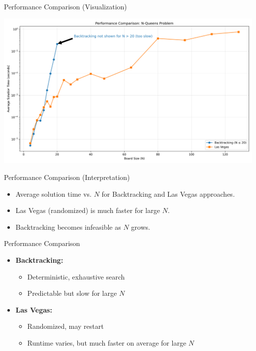 \begin{frame}{Performance Comparison (Visualization)}
  \vfill
  \begin{center}
    \includegraphics[height=0.95\textheight]{./programs/nqueens-lv/images/performance-comparison.png}
  \end{center}
  \vfill
\end{frame}

\begin{frame}{Performance Comparison (Interpretation)}
  \begin{itemize}
    \item Average solution time vs. $N$ for Backtracking and Las Vegas approaches.
    \item Las Vegas (randomized) is much faster for large $N$.
    \item Backtracking becomes infeasible as $N$ grows.
  \end{itemize}
\end{frame}

\begin{frame}{Performance Comparison}
  \begin{itemize}
    \item \textbf{Backtracking:}
          \begin{itemize}
            \item Deterministic, exhaustive search
            \item Predictable but slow for large $N$
          \end{itemize}
    \item \textbf{Las Vegas:}
          \begin{itemize}
            \item Randomized, may restart
            \item Runtime varies, but much faster on average for large $N$
          \end{itemize}
  \end{itemize}
\end{frame}

